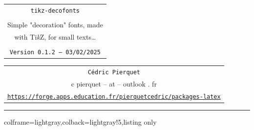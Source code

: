 \documentclass[11pt,a4paper]{ltxdoc}
\def\TPversion{0.1.2}
\def\TPdate{03/02/2025}
\begin{document}
\thispagestyle{empty}

\begin{center}
	\begin{minipage}{0.88\linewidth}
		\begin{tcolorbox}[colframe=yellow,colback=yellow!15]
			\begin{center}
				\renewcommand{\arraystretch}{1.25}%
				\begin{tabular}{c}
					{\Huge \texttt{tikz-decofonts}}\\
					\\
					{\LARGE Simple "decoration" fonts, made} \\
					{\LARGE with Ti\textit{k}Z, for small texts\ldots} \\
					\\
					{\small \texttt{Version \TPversion{} -- \TPdate}}
				\end{tabular}
			\end{center}
		\end{tcolorbox}
	\end{minipage}
\end{center}

\begin{center}
	\begin{tabular}{c}
		\texttt{Cédric Pierquet}\\
		{\ttfamily c pierquet -- at -- outlook . fr}\\
		\texttt{\url{https://forge.apps.education.fr/pierquetcedric/packages-latex}} \\
	\end{tabular}
\end{center}

\hrule

\vfill

\begin{tcblisting}{colframe=lightgray,colback=lightgray!5,listing only}
\end{tcblisting}

\begin{tcolorbox}[colframe=lightgray,colback=lightgray!5]
\end{tcolorbox}

\begin{tcolorbox}[colframe=lightgray,colback=lightgray!5]
\hfill{}\hfill~
\end{tcolorbox}
\end{document}
